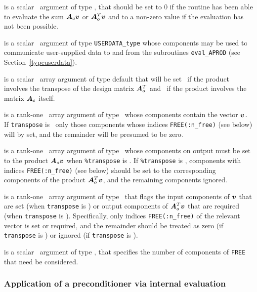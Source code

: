 \documentclass{galahad}
\begin{document}
\begin{description}
 is a scalar \intentout\ argument of type \integer,
that should be set to 0 if the routine has been able to evaluate the
sum ${\bm{A}}_o {\bm{v}}$ or ${\bm{A}}_o^T{\bm{v}}$
and to a non-zero value if the evaluation has not been possible.

 is a scalar \intentinout\ argument of type
{\tt USERDATA\_type} whose components may be used
to communicate user-supplied data to and from the subroutines
{\tt eval\_APROD}
(see Section~\ref{typeuserdata}).

 is a scalar \intentin\ array argument of type
default that will be set \true\ if the product involves the transpose
of the design matrix ${\bm{A}}_o^T$ and \false\ if the product involves
the matrix ${\bm{A}}_o$ itself.

 is a rank-one \intentin\ array argument of type \realdp\
whose components contain the vector ${\bm{v}}$. If {\tt transpose} is \false\
only those components whose indices {\tt FREE(:n\_free)} (see below)
will by set, and the remainder will be presumed to be zero.

 is a rank-one \intentout\ array argument of type \realdp\
whose components on output must be set to the
product ${\bm{A}}_o {\bm{v}}$ when {\tt \%transpose} is \false. If
{\tt \%transpose} is \true, components with indices {\tt FREE(:n\_free)}
(see below) should be set to the corresponding components of the
product ${\bm{A}}_o^T {\bm{v}}$, and the remaining components ignored.

\itt{FREE} is a rank-one \intentin\ array argument of
type \integer\ that flags the input components of ${\bm{v}}$ that are set
(when {\tt transpose} is \false) or output components of ${\bm{A}}_o^T {\bm{v}}$ that
are required (when {\tt transpose} is \true). Specifically, only indices
{\tt FREE(:n\_free)} of the relevant vector is set or required, and the
remainder should be treated as zero (if {\tt transpose} is \false)
or ignored  (if {\tt transpose} is \true).

\itt{n\_free} is a scalar \intentin\ argument of type \integer,
that specifies the number of components of {\tt FREE} that need be considered.

\end{description}


\subsubsection{Application of a preconditioner via internal evaluation
\label{prec}}
\end{document}
